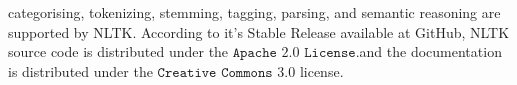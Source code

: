 \documentclass[sn-mathphys]{sn-jnl}%
\theoremstyle{thmstyleone}%
\theoremstyle{thmstyletwo}%
\theoremstyle{thmstylethree}%
\begin{document}
categorising, tokenizing, stemming, tagging, parsing, and semantic reasoning are supported by NLTK. According to it's Stable Release available at GitHub, NLTK source code is distributed under the $\mathtt{Apache}$  $\mathtt{2.0}$ $\mathtt{License}$.and the documentation is distributed under the $\mathtt{Creative}$ $\mathtt{Commons}$ $\mathtt{3.0}$ license.
\end{document}
